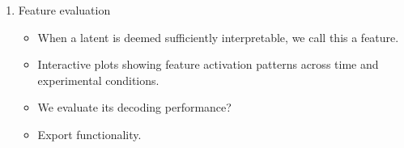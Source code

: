\begin{itemize}
\begin{enumerate}
        \item Feature evaluation
        \begin{itemize}
            \item When a latent is deemed sufficiently interpretable, we call this a feature.
            \item Interactive plots showing feature activation patterns across time and experimental conditions.
            \item We evaluate its decoding performance?
            \item Export functionality.
        \end{itemize}
    \end{enumerate}
\end{itemize}
